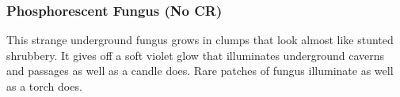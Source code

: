 \subsubsection{Phosphorescent Fungus (No CR)}
This strange underground fungus grows in clumps that look almost like stunted shrubbery. It gives off a soft violet glow that illuminates underground caverns and passages as well as a candle does. Rare patches of fungus illuminate as well as a torch does.

